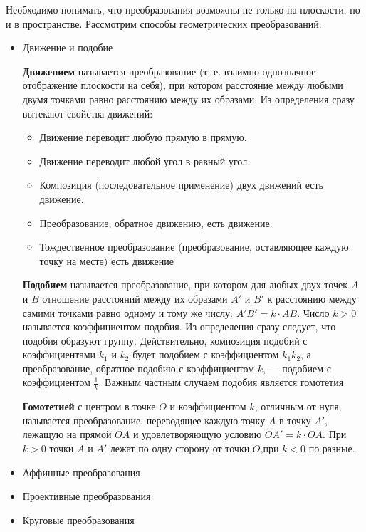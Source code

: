 \documentclass[]{article}
\begin{document}
Необходимо понимать, что преобразования возможны не только на плоскости, но и в пространстве. Рассмотрим способы геометрических преобразований:

\begin{itemize}[noitemsep]
	\item Движение и подобие
	
	\textbf{Движением} называется преобразование (т. е.
	взаимно однозначное отображение плоскости на себя), при котором расстояние между любыми двумя точками равно расстоянию между их образами.
	Из определения сразу вытекают свойства движений:
	\begin{itemize}[noitemsep]
	\item Движение переводит любую прямую в прямую.
	\item Движение переводит любой угол в равный угол.
	\item Композиция (последовательное применение) двух движений есть
	движение.
	\item Преобразование, обратное движению, есть движение.
	\item Тождественное преобразование (преобразование, оставляющее
	каждую точку на месте) есть движение
	\end{itemize}	

	\textbf{Подобием} называется преобразование, при котором для любых двух точек $A$ и $B$ отношение расстояний между их образами $A'$ и $B'$ к расстоянию между самими точками равно одному и тому
	же числу: $A'B'= k \cdot AB$. Число $k > 0$ называется коэффициентом подобия. Из определения сразу следует, что подобия образуют группу. Действительно, композиция подобий с коэффициентами $k_1$ и $k_2$ будет подобием с коэффициентом $k_1k_2$, а преобразование, обратное подобию с коэффициентом $k$, — подобием с коэффициентом $\frac{1}{k}$. Важным частным случаем подобия является гомотетия
	
	\textbf{Гомотетией} с центром в точке $O$ и коэффициентом $k$, отличным от нуля, называется преобразование, переводящее каждую точку $A$ в точку $A'$, лежащую на прямой $OA$ и удовлетворяющую условию $OA' = k \cdot OA$. При $k > 0$ точки $A$ и $A'$ лежат по одну сторону от точки $O$,при $k < 0$ по разные.
	\item Аффинные преобразования
	\item Проективные преобразования
	\item Круговые преобразования
\end{itemize}
\end{document}
